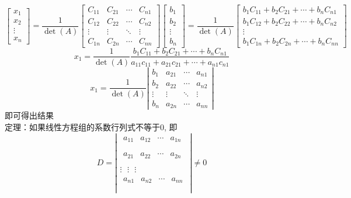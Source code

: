 $$\left[\begin{array}{c}{x_{1}} \\ {x_{2}} \\ {\vdots} \\ {x_{n}}\end{array}\right]=\frac{1}{\operatorname{det}(A)}\left[\begin{array}{cccc}{C_{11}} & {C_{21}} & {\cdots} & {C_{n 1}} \\ {C_{12}} & {C_{22}} & {\cdots} & {C_{n 2}} \\ {\vdots} & {\vdots} & {\ddots} & {\vdots} \\ {C_{1 n}} & {C_{2 n}} & {\cdots} & {C_{n n}}\end{array}\right]\left[\begin{array}{c}{b_{1}} \\ {b_{2}} \\ {\vdots} \\ {b_{n}}\end{array}\right]=\frac{1}{\operatorname{det}(A)}\left[\begin{array}{c}{b_{1} C_{11}+b_{2} C_{21}+\cdots+b_{n} C_{n 1}} \\ {b_{1} C_{12}+b_{2} C_{22}+\cdots+b_{n} C_{n 2}} \\ {\vdots} \\ {b_{1} C_{1 n}+b_{2} C_{2 n}+\cdots+b_{n} C_{n n}}\end{array}\right] $$
$$x_{1}=\frac{1}{\operatorname{det}(A)} \frac{b_{1} C_{11}+b_{2} C_{21}+\cdots+b_{n} C_{n 1}}{a_{11} c_{11}+a_{21} c_{21}+\cdots+a_{n 1} c_{n 1}}$$
$$x_{1}=\frac{1}{\operatorname{det}(A)}\left|\begin{array}{cccc}{b_{1}} & {a_{21}} & {\cdots} & {a_{n 1}} \\ {b_{2}} & {a_{22}} & {\cdots} & {a_{n 2}} \\ {\vdots} & {\vdots} & {\ddots} & {\vdots} \\ {b_{n}} & {a_{2 n}} & {\cdots} & {a_{n n}}\end{array}\right|$$
即可得出结果 \\
{\color{blue}定理：}如果线性方程组的系数行列式不等于0, 即
$$
D=\left| \begin{matrix}
\begin{matrix}
{{a}_{11}} & {{a}_{12}} & \cdots  & {{a}_{1n}}  \\
\end{matrix}  \\
\begin{matrix}
{{a}_{21}} & {{a}_{22}} & \cdots  & {{a}_{2n}}  \\
\end{matrix}  \\
\vdots \text{   }\vdots \text{      }\vdots   \\
\begin{matrix}
{{a}_{n1}} & {{a}_{n2}} & \cdots  & {{a}_{nn}}  \\
\end{matrix}  \\
\end{matrix} \right|\ne 0 
$$
